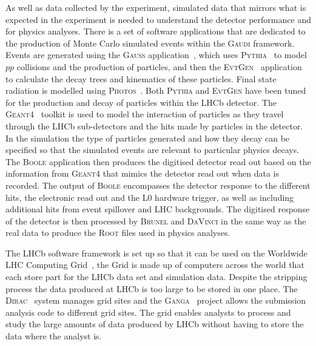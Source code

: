 As well as data collected by the experiment, simulated data that mirrors what is expected in the experiment is needed to understand the detector performance and for physics analyses. There is a set of software applications that are dedicated to the production of Monte Carlo simulated events within the \textsc{Gaudi} framework. Events are generated using the \textsc{Gauss} application~\cite{1742-6596-331-3-032047, Clemencic:2011zza}, which uses \textsc{Pythia}~\cite{Sjostrand:2006za,Sjostrand:2007gs} to model $pp$ collisions and the production of particles, and then the \textsc{Evt}\textsc{Gen}~\cite{Lange:2001uf} application to calculate the decay trees and kinematics of these particles. Final state radiation is modelled using \textsc{Photos}~\cite{Golonka:2005pn}. Both \textsc{Pythia} and \textsc{Evt}\textsc{Gen} have been tuned for the production and decay of particles within the LHCb detector. The \textsc{Geant4}~\cite{Agostinelli:2002hh,Allison:2006ve} toolkit is used to model the interaction of particles as they travel through the LHCb sub-detectors and the hits made by particles in the detector. In the simulation the type of particles generated and how they decay can be specified so that the simulated events are relevant to particular physics decays. The \textsc{Boole} application then produces the digitised detector read out based on the information from \textsc{Geant4} that mimics the detector read out when data is recorded. The output of \textsc{Boole} encompasses the detector response to the different hits, the electronic read out and the L0 hardware trigger, as well as including additional hits from event spillover and LHC backgrounds. The digitised response of the detector is then processed by \textsc{Brunel} and \textsc{DaVinci} in the same way as the real data to produce the \textsc{Root} files used in physics analyses. %

The LHCb software framework is set up so that it can be used on the Worldwide LHC Computing Grid~\cite{Bird:2011zz, WWCG}, the Grid is made up of computers across the world that each store part for the LHCb data set and simulation data. Despite the stripping process the data produced at LHCb is too large to be stored in one place. The \textsc{Dirac}~\cite{Paterson:1397926} system manages grid sites and the \textsc{Ganga}~\cite{Ganga, Ganga2} project allows the submission analysis code to different grid sites. The grid enables analysts to process and study the large amounts of data produced by LHCb without having to store the data where the analyst is. 





